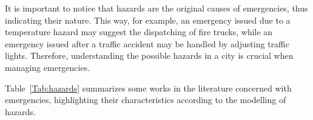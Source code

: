 \begin{refsection}
It is important to notice that hazards are the original causes of emergencies, thus indicating their nature. This way, for example, an emergency issued due to a temperature hazard may suggest the dispatching of fire trucks, while an emergency issued after a traffic accident may be handled by adjusting traffic lights. Therefore, understanding the possible hazards in a city is crucial when managing emergencies. 

Table~\ref{Tab:hazards} summarizes some works in the literature concerned with emergencies, highlighting their characteristics according to the modelling of hazards.

\begin{table}
  \centering
  \caption{Research works and the modelling of hazards and emergencies.}\label{Tab:hazards}
\end{table}
\end{refsection}
